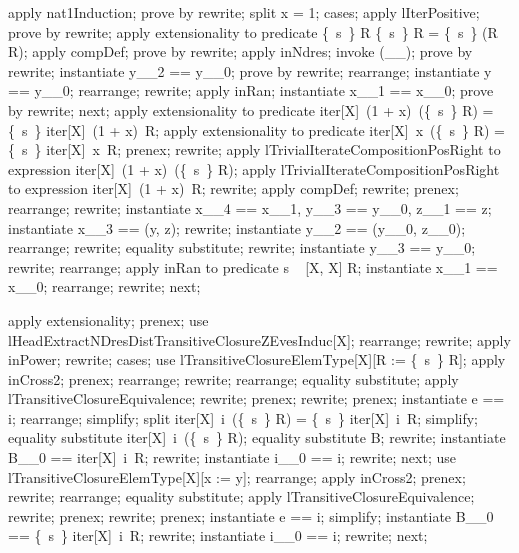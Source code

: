 \begin{LPScript}\begin{forget}[lHeadExtractNDresDistTransitiveClosureZEvesInduc]
apply nat1Induction;
prove by rewrite;
split x = 1;
cases;
apply lIterPositive;
prove by rewrite;
apply extensionality to predicate
    \{~s~\} \ndres [X, X] R \comp [X, X, X] \{~s~\} \ndres [X, X] R =
    \{~s~\} \ndres [X, X] (R \comp [X, X, X] R);
apply compDef;
prove by rewrite;
apply inNdres;
invoke (\_\rel \_);
prove by rewrite;
instantiate y\_\_2 == y\_\_0;
prove by rewrite;
rearrange;
instantiate y == y\_\_0;
rearrange;
rewrite;
apply inRan;
instantiate x\_\_1 == x\_\_0;
prove by rewrite;
next;
apply extensionality to predicate
    iter[X]~(1 + x)~(\{~s~\} \ndres [X, X] R) = \{~s~\} \ndres [X, X] iter[X]~(1 + x)~R;
apply extensionality to predicate
    iter[X]~x~(\{~s~\} \ndres [X, X] R) = \{~s~\} \ndres [X, X] iter[X]~x~R;
prenex;
rewrite;
apply lTrivialIterateCompositionPosRight to
    expression iter[X]~(1 + x)~(\{~s~\} \ndres [X, X] R);
apply lTrivialIterateCompositionPosRight to
    expression iter[X]~(1 + x)~R;
rewrite;
apply compDef;
rewrite;
prenex;
rearrange;
rewrite;
instantiate x\_\_4 == x\_\_1, y\_\_3 == y\_\_0, z\_\_1 == z;
instantiate x\_\_3 == (y, z);
rewrite;
instantiate y\_\_2 == (y\_\_0, z\_\_0);
rearrange;
rewrite;
equality substitute;
rewrite;
instantiate y\_\_3 == y\_\_0;
rewrite;
rearrange;
apply inRan to predicate s \in  \ran~ [X, X] R;
instantiate x\_\_1 == x\_\_0;
rearrange;
rewrite;
next;
\end{forget}\end{LPScript}

\begin{LPScript}\begin{forget}[lHeadExtractNDresDistTransitiveClosure]
apply extensionality;
prenex;
use lHeadExtractNDresDistTransitiveClosureZEvesInduc[X];
rearrange;
rewrite;
apply inPower;
rewrite;
cases;
use lTransitiveClosureElemType[X][R := \{~s~\} \ndres [X, X] R];
apply inCross2;
prenex;
rearrange;
rewrite;
rearrange;
equality substitute;
apply lTransitiveClosureEquivalence;
rewrite;
prenex;
rewrite;
prenex;
instantiate e == i;
rearrange;
simplify;
split iter[X]~i~(\{~s~\} \ndres [X, X] R) = \{~s~\} \ndres [X, X] iter[X]~i~R;
simplify;
equality substitute iter[X]~i~(\{~s~\} \ndres [X, X] R);
equality substitute B;
rewrite;
instantiate B\_\_0 == iter[X]~i~R;
rewrite;
instantiate i\_\_0 == i;
rewrite;
next;
use lTransitiveClosureElemType[X][x := y];
rearrange;
apply inCross2;
prenex;
rewrite;
rearrange;
equality substitute;
apply lTransitiveClosureEquivalence;
rewrite;
prenex;
rewrite;
prenex;
instantiate e == i;
simplify;
instantiate B\_\_0 == \{~s~\} \ndres [X, X] iter[X]~i~R;
rewrite;
instantiate i\_\_0 == i;
rewrite;
next;
\end{forget}\end{LPScript}


